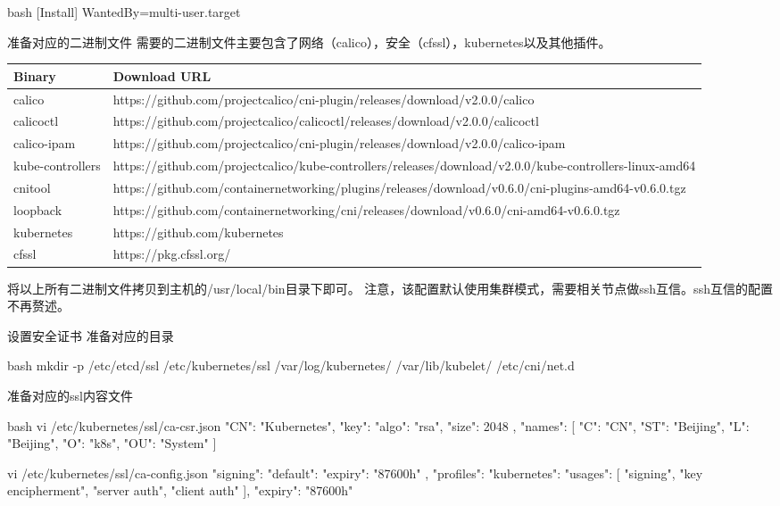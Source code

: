 \begin{outline}[enumerate]
\begin{code-in-enumerate}{bash}
[Install]
WantedBy=multi-user.target
\end{code-in-enumerate}

  \1 准备对应的二进制文件
需要的二进制文件主要包含了网络（calico），安全（cfssl），kubernetes以及其他插件。
\begin{center}
  \begin{tabularx}{\textwidth}{|l|X|}
  \hline
  Binary & Download URL\\ \hline
  calico & https://github.com/projectcalico/cni-plugin/releases/download/v2.0.0/calico\\
  calicoctl & https://github.com/projectcalico/calicoctl/releases/download/v2.0.0/calicoctl \\
  calico-ipam & https://github.com/projectcalico/cni-plugin/releases/download/v2.0.0/calico-ipam \\
  kube-controllers & https://github.com/projectcalico/kube-controllers/releases/download/v2.0.0/kube-controllers-linux-amd64 \\
  cnitool & https://github.com/containernetworking/plugins/releases/download/v0.6.0/cni-plugins-amd64-v0.6.0.tgz \\
  loopback & https://github.com/containernetworking/cni/releases/download/v0.6.0/cni-amd64-v0.6.0.tgz \\
  kubernetes & https://github.com/kubernetes \\
  cfssl & https://pkg.cfssl.org/ \\
  \hline
  \end{tabularx}
  \label{tab:Binary files}
\end{center}
将以上所有二进制文件拷贝到主机的/usr/local/bin目录下即可。
注意，该配置默认使用集群模式，需要相关节点做ssh互信。ssh互信的配置不再赘述。

  \1 设置安全证书
准备对应的目录
\begin{code-in-enumerate}{bash}
mkdir -p /etc/etcd/ssl /etc/kubernetes/ssl /var/log/kubernetes/ /var/lib/kubelet/ /etc/cni/net.d
\end{code-in-enumerate}
准备对应的ssl内容文件
\begin{code-in-enumerate}{bash}
vi /etc/kubernetes/ssl/ca-csr.json
{
    "CN": "Kubernetes",
    "key": {
        "algo": "rsa",
        "size": 2048
    },
    "names": [
        {
            "C": "CN",
            "ST": "Beijing",
            "L": "Beijing",
            "O": "k8s",
            "OU": "System"
        }
    ]
}

vi /etc/kubernetes/ssl/ca-config.json
{
    "signing": {
        "default": {
            "expiry": "87600h"
        },
        "profiles": {
            "kubernetes": {
                "usages": [
                    "signing",
                    "key encipherment",
                    "server auth",
                    "client auth"
                ],
                "expiry": "87600h"
            }
        }
    }
}


\end{code-in-enumerate}
\end{outline}
